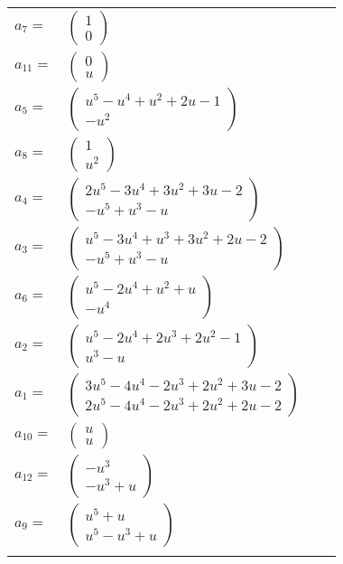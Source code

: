\documentclass[1p]{elsarticle_modified}
\theoremstyle{definition}
\begin{document}
\begin{tabular}{m{7pt} m{180pt} m{7pt} m{180pt} }
\flushright $a_{7}=$&$\begin{pmatrix}1\\0\end{pmatrix}$ \\
\flushright $a_{11}=$&$\begin{pmatrix}0\\u\end{pmatrix}$ \\
\flushright $a_{5}=$&$\begin{pmatrix}u^5- u^4+u^2+2 u-1\\- u^2\end{pmatrix}$ \\
\flushright $a_{8}=$&$\begin{pmatrix}1\\u^2\end{pmatrix}$ \\
\flushright $a_{4}=$&$\begin{pmatrix}2 u^5-3 u^4+3 u^2+3 u-2\\- u^5+u^3- u\end{pmatrix}$ \\
\flushright $a_{3}=$&$\begin{pmatrix}u^5-3 u^4+u^3+3 u^2+2 u-2\\- u^5+u^3- u\end{pmatrix}$ \\
\flushright $a_{6}=$&$\begin{pmatrix}u^5-2 u^4+u^2+u\\- u^4\end{pmatrix}$ \\
\flushright $a_{2}=$&$\begin{pmatrix}u^5-2 u^4+2 u^3+2 u^2-1\\u^3- u\end{pmatrix}$ \\
\flushright $a_{1}=$&$\begin{pmatrix}3 u^5-4 u^4-2 u^3+2 u^2+3 u-2\\2 u^5-4 u^4-2 u^3+2 u^2+2 u-2\end{pmatrix}$ \\
\flushright $a_{10}=$&$\begin{pmatrix}u\\u\end{pmatrix}$ \\
\flushright $a_{12}=$&$\begin{pmatrix}- u^3\\- u^3+u\end{pmatrix}$ \\
\flushright $a_{9}=$&$\begin{pmatrix}u^5+u\\u^5- u^3+u\end{pmatrix}$\\&\end{tabular}
\end{document}
